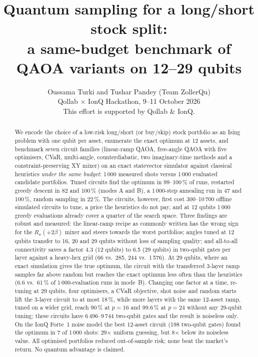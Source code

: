 \documentclass[10pt,twocolumn]{article}
\title{\vspace{-0.9cm}\LARGE\bfseries Quantum sampling for a long/short stock split:\\\Large a same-budget benchmark of QAOA variants on 12--29 qubits}
\author{Oussama Turki and Tushar Pandey (Team ZollerQu)\\\small Qollab $\times$ IonQ Hackathon, 9--11 October 2026\\\small This effort is supported by Qollab \& IonQ.}
\date{}
\begin{document}
\maketitle

\begin{abstract}\noindent
We encode the choice of a low-risk long/short (or buy/skip) stock portfolio as an Ising problem with one qubit per asset, enumerate the exact optimum at 12 assets, and benchmark seven circuit families (linear-ramp QAOA, free-angle QAOA with five optimisers, CVaR, multi-angle, counterdiabatic, two imaginary-time methods and a constraint-preserving XY mixer) on an exact statevector simulator against classical heuristics \emph{under the same budget}: 1\,000 measured shots versus 1\,000 evaluated candidate portfolios. Tuned circuits find the optimum in 99--100\,\% of runs, restarted greedy descent in 82 and 100\,\% (modes A and B), a 1\,000-step annealing run in 47 and 100\,\%, random sampling in 22\,\%. The circuits, however, first cost 300--10\,700 offline simulated circuits to tune, a price the heuristics do not pay, and at 12 qubits 1\,000 greedy evaluations already cover a quarter of the search space. Three findings are robust and measured: the linear-ramp recipe as commonly written has the wrong sign for the $R_x(+2\beta)$ mixer and steers towards the worst portfolios; angles tuned at 12 qubits transfer to 16, 20 and 29 qubits without loss of sampling quality; and all-to-all connectivity saves a factor 4.3 (12 qubits) to 6.5 (29 qubits) in two-qubit gates per layer against a heavy-hex grid (66 vs.\ 285, 244 vs.\ 1\,576). At 29 qubits, where an exact simulation gives the true optimum, the circuit with the transferred 3-layer ramp samples far above random but reaches the exact optimum less often than the heuristics (6.6 vs.\ 61\,\% of 1\,000-evaluation runs in mode~B). Changing one factor at a time, re-tuning at 29 qubits, four optimisers, a CVaR objective, shot noise and random starts lift the 3-layer circuit to at most 18\,\%, while more layers with the same 12-asset ramp, tuned on a wider grid, reach 90\,\% at $p=16$ and 99.6\,\% at $p=24$ without any 29-qubit tuning; these circuits have 6\,496--9\,744 two-qubit gates and the result is noiseless only. On the IonQ Forte~1 noise model the best 12-asset circuit (198 two-qubit gates) found the optimum in 7 of 1\,000 shots: 29$\times$ uniform guessing, but 8$\times$ below its noiseless value. All optimised portfolios reduced out-of-sample risk; none beat the market's return. No quantum advantage is claimed.
\end{abstract}
\end{document}
